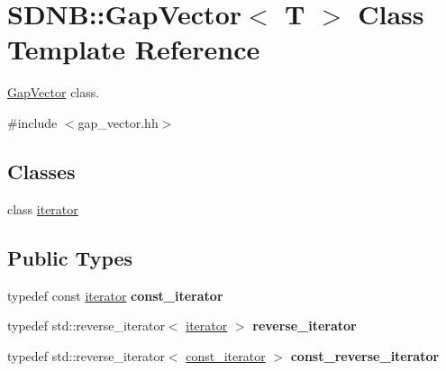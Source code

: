 \hypertarget{classSDNB_1_1GapVector}{}\section{S\+D\+N\+B\+:\+:Gap\+Vector$<$ T $>$ Class Template Reference}
\label{classSDNB_1_1GapVector}


\hyperlink{classSDNB_1_1GapVector}{Gap\+Vector} class.  




{\ttfamily \#include $<$gap\+\_\+vector.\+hh$>$}

\subsection*{Classes}
\begin{DoxyCompactItemize}
\item 
class \hyperlink{classSDNB_1_1GapVector_1_1iterator}{iterator}
\end{DoxyCompactItemize}
\subsection*{Public Types}
\begin{DoxyCompactItemize}
\item 
\hypertarget{classSDNB_1_1GapVector_a5f7b534c044fec7f25fa430c88fd167e}{}typedef const \hyperlink{classSDNB_1_1GapVector_1_1iterator}{iterator} {\bfseries const\+\_\+iterator}\label{classSDNB_1_1GapVector_a5f7b534c044fec7f25fa430c88fd167e}

\item 
\hypertarget{classSDNB_1_1GapVector_aa2476e7a8104ca8d5b61f7873b76a18e}{}typedef std\+::reverse\+\_\+iterator$<$ \hyperlink{classSDNB_1_1GapVector_1_1iterator}{iterator} $>$ {\bfseries reverse\+\_\+iterator}\label{classSDNB_1_1GapVector_aa2476e7a8104ca8d5b61f7873b76a18e}

\item 
\hypertarget{classSDNB_1_1GapVector_a37c5f4d092df95a05852a9d3014e9bf4}{}typedef std\+::reverse\+\_\+iterator$<$ \hyperlink{classSDNB_1_1GapVector_1_1iterator}{const\+\_\+iterator} $>$ {\bfseries const\+\_\+reverse\+\_\+iterator}\label{classSDNB_1_1GapVector_a37c5f4d092df95a05852a9d3014e9bf4}

\end{DoxyCompactItemize}
